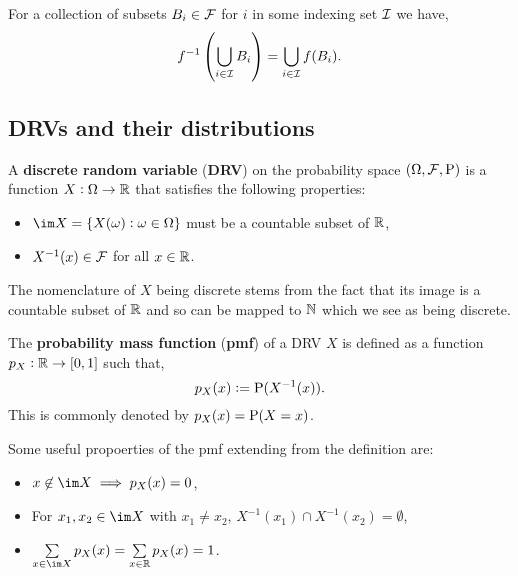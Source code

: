 \documentclass[../Year1/Year1.tex]{subfiles}
\begin{document}
\begingroup\belowdisplayskip=-10pt
\begin{lemma}
    For a collection of subsets $B_i \in \FFF$ for $i$ in some indexing set $\III$ we have, \[
        f^{-1}\left(\bigcup_{i\in\III} B_i \right) = \bigcup_{i\in\III} f(B_i) \textcolor{black}{.}
    \]
\end{lemma}
\endgroup

\subsection{DRVs and their distributions}

\begin{definition}
    A \textbf{discrete random variable} (\textbf{DRV}) on the probability space $(\Omega, \FFF, \P)$ is a function $X: \Omega \rightarrow \RR$ that satisfies the following properties:
    \begin{itemize}
        \item $\im X = \{X(\omega): \omega \in \Omega\}$ must be a countable subset of $\RR$,
        \item $X^{-1}(x) \in \FFF$ for all $x \in \RR$.
    \end{itemize}
\end{definition}

\begin{remark}
    The nomenclature of $X$ being discrete stems from the fact that its image is a countable subset of $\RR$ and so can be mapped to $\NN$ which we see as being discrete.
\end{remark}

\begin{definition}
    The \textbf{probability mass function} (\textbf{pmf}) of a DRV $X$ is defined as a function $p_X: \RR \rightarrow [0,1]$ such that, \[
        p_X(x) := \P(X^{-1}(x))\textcolor{black}{.}
    \]
    This is commonly denoted by $p_X(x) = \P(X=x)$.
\end{definition}

\begin{remark}
    Some useful propoerties of the pmf extending from the definition are:
    \begin{itemize}
        \item $x \not\in \im X \implies p_X(x) = 0$,
        \item For $x_1, x_2 \in \im X$ with $x_1 \neq x_2$, $X^{-1}(x_1) \cap X^{-1}(x_2) = \emptyset$,
        \item $\sum\limits_{x\in\im X}p_X(x) = \sum\limits_{x\in\RR}p_X(x) = 1$.
    \end{itemize}
\end{remark}
\end{document}

